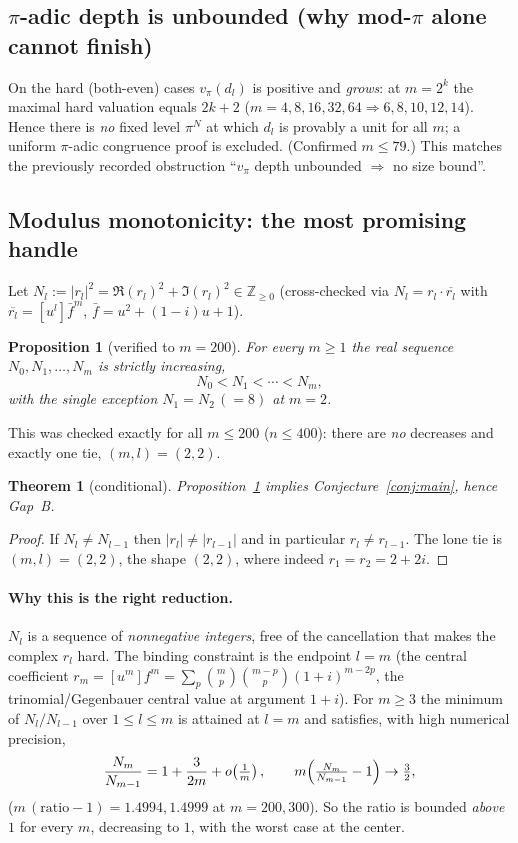 \documentclass[11pt]{article}
\newtheorem{theorem}{Theorem}
\newtheorem{proposition}{Proposition}
\theoremstyle{definition}
\newcommand{\Z}{\mathbb{Z}}
\newcommand{\vpi}{v_\pi}
\begin{document}
\subsection{$\pi$-adic depth is unbounded (why mod-$\pi$ alone cannot finish)}

On the hard (both-even) cases $\vpi(d_l)$ is positive and \emph{grows}: at
$m=2^k$ the maximal hard valuation equals $2k+2$
($m=4,8,16,32,64\Rightarrow 6,8,10,12,14$). Hence there is \emph{no} fixed level
$\pi^N$ at which $d_l$ is provably a unit for all $m$; a uniform $\pi$-adic
congruence proof is excluded. (Confirmed $m\le 79$.) This matches the previously
recorded obstruction ``$v_\pi$ depth unbounded $\Rightarrow$ no size bound''.

\subsection{Modulus monotonicity: the most promising handle}

Let $N_l:=|r_l|^2=\Re(r_l)^2+\Im(r_l)^2\in\Z_{\ge0}$ (cross-checked via
$N_l=r_l\cdot\overline{r_l}$ with $\overline{r_l}=[u^l]\bar f^m$,
$\bar f=u^2+(1-i)u+1$).

\begin{proposition}[verified to $m=200$]\label{prop:mono}
For every $m\ge1$ the real sequence $N_0,N_1,\dots,N_m$ is strictly increasing,
\[
  N_0<N_1<\cdots<N_m,
\]
with the \emph{single} exception $N_1=N_2\,(=8)$ at $m=2$.
\end{proposition}

This was checked exactly for all $m\le 200$ ($n\le400$): there are \emph{no}
decreases and exactly one tie, $(m,l)=(2,2)$.

\begin{theorem}[conditional]\label{thm:cond}
Proposition~\ref{prop:mono} implies Conjecture~\ref{conj:main}, hence Gap~B.
\end{theorem}
\begin{proof}
If $N_l\ne N_{l-1}$ then $|r_l|\ne|r_{l-1}|$ and in particular $r_l\ne r_{l-1}$.
The lone tie is $(m,l)=(2,2)$, the shape $(2,2)$, where indeed
$r_1=r_2=2+2i$.
\end{proof}

\paragraph{Why this is the right reduction.}
$N_l$ is a sequence of \emph{nonnegative integers}, free of the cancellation that
makes the complex $r_l$ hard. The binding constraint is the endpoint $l=m$
(the central coefficient $r_m=[u^m]f^m=\sum_p\binom{m}{p}\binom{m-p}{p}(1+i)^{m-2p}$,
the trinomial/Gegenbauer central value at argument $1+i$). For $m\ge3$ the minimum
of $N_l/N_{l-1}$ over $1\le l\le m$ is attained at $l=m$ and satisfies, with high
numerical precision,
\[
  \frac{N_m}{N_{m-1}}=1+\frac{3}{2m}+o\!\left(\tfrac1m\right),
\qquad
  m\Bigl(\tfrac{N_m}{N_{m-1}}-1\Bigr)\to \tfrac32 ,
\]
($m\,(\text{ratio}-1)=1.4994,1.4999$ at $m=200,300$). So the ratio is bounded
\emph{above} $1$ for every $m$, decreasing to $1$, with the worst case at the
center.
\end{document}
